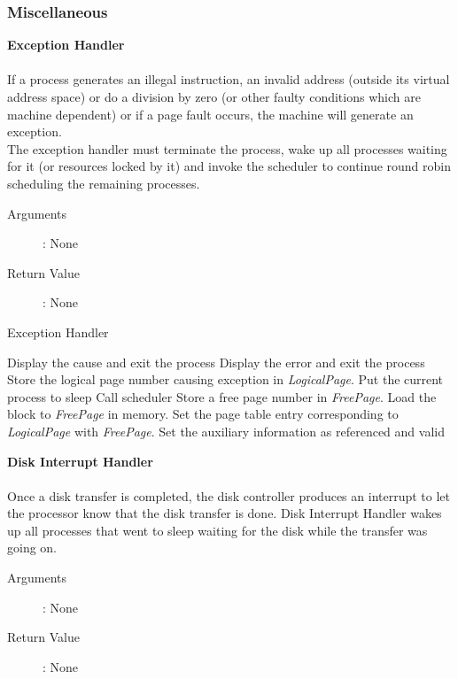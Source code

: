 \documentclass[10pt]{article}
\begin{document}
\subsubsection{Miscellaneous}
\textbf{Exception Handler}
\\ \\
If a process generates an illegal instruction, an invalid address (outside its virtual address space) or do a division by zero (or other faulty conditions which are machine dependent) or if a page fault occurs, the machine will generate an exception. 
\\
The exception handler must terminate the process, wake up all processes waiting for it (or resources locked by it) and invoke the scheduler to continue round robin scheduling the remaining processes.
\begin{description}
\item[Arguments]: None
\item[Return Value]: None
\end{description} 
\begin{algorithm}
\caption{Exception Handler}
\begin{algorithmic}
    \STATE Display the cause and exit the process
\ENDIF
{}
    \STATE Display the error and exit the process
\ELSE
    \STATE Store the logical page number causing exception in \textit{LogicalPage}.
        \STATE Put the current process to sleep
        \STATE Call scheduler
    \ENDWHILE
    \STATE Store a free page number in \textit{FreePage}.
        \STATE Load the block to \textit{FreePage} in memory.
    \ENDIF
    \STATE Set the page table entry corresponding to \textit{LogicalPage} with \textit{FreePage}.
    \STATE Set the auxiliary information as referenced and valid
\ENDIF
\RETURN
\end{algorithmic}
\end{algorithm}
\vspace{45mm}
\textbf{Disk Interrupt Handler}
\\ \\
Once a disk transfer is completed, the disk controller produces an interrupt to let the processor know that the disk transfer is done. Disk Interrupt Handler wakes up all processes that went to sleep waiting for the disk while the transfer was going on. 
\begin{description}
\item[Arguments]: None
\item[Return Value]: None
\end{description} 
\end{document}
